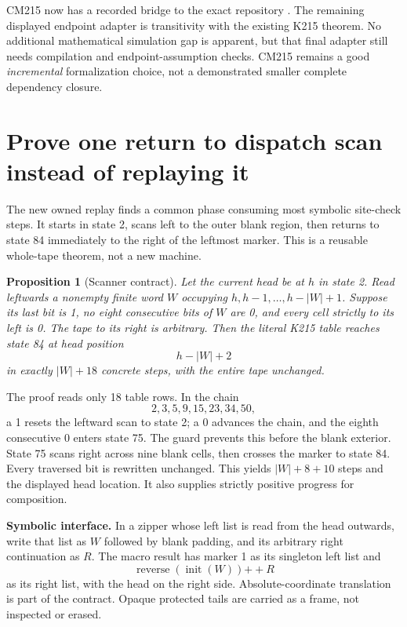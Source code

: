 \documentclass[11pt]{article}
\newtheorem{proposition}{Proposition}[section]
\newcommand{\file}[1]{{\small\path{#1}}}
\begin{document}
CM215 now has a recorded bridge to the exact repository \file{KDense215.machine215}. The remaining displayed endpoint adapter is transitivity with the existing K215 theorem. No additional mathematical simulation gap is apparent, but that final adapter still needs compilation and endpoint-assumption checks. CM215 remains a good \emph{incremental} formalization choice, not a demonstrated smaller complete dependency closure.

\section{Prove one return to dispatch scan instead of replaying it}
The new owned replay finds a common phase consuming most symbolic site-check steps. It starts in state 2, scans left to the outer blank region, then returns to state 84 immediately to the right of the leftmost marker. This is a reusable whole-tape theorem, not a new machine.

\begin{proposition}[Scanner contract]
Let the current head be at $h$ in state 2. Read leftwards a nonempty finite word $W$ occupying $h,h-1,\ldots,h-|W|+1$. Suppose its last bit is 1, no eight consecutive bits of $W$ are 0, and every cell strictly to its left is 0. The tape to its right is arbitrary. Then the literal K215 table reaches state 84 at head position
\[
 h-|W|+2
\]
in exactly $|W|+18$ concrete steps, with the entire tape unchanged.
\end{proposition}

The proof reads only 18 table rows. In the chain
\[
 2,3,5,9,15,23,34,50,
\]
a 1 resets the leftward scan to state 2; a 0 advances the chain, and the eighth consecutive 0 enters state 75. The guard prevents this before the blank exterior. State 75 scans right across nine blank cells, then crosses the marker to state 84. Every traversed bit is rewritten unchanged. This yields $|W|+8+10$ steps and the displayed head location. It also supplies strictly positive progress for composition.

\textbf{Symbolic interface.} In a zipper whose left list is read from the head outwards, write that list as $W$ followed by blank padding, and its arbitrary right continuation as $R$. The macro result has marker 1 as its singleton left list and
\[
 \operatorname{reverse}(\operatorname{init}(W))\mathbin{+\!+}R
\]
as its right list, with the head on the right side. Absolute-coordinate translation is part of the contract. Opaque protected tails are carried as a frame, not inspected or erased.
\end{document}
